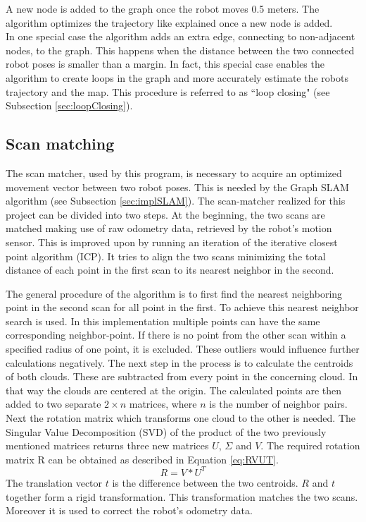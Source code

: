\documentclass{ba-kecs}
\begin{document}
A new node is added to the graph once the robot moves 0.5 meters. The algorithm optimizes the trajectory like explained once a new node is added.\\
In one special case the algorithm adds an extra edge, connecting to non-adjacent nodes, to the graph. This happens when the distance between the two connected robot poses is smaller than a margin. In fact, this special case enables the algorithm to create loops in the graph and more accurately estimate the robots trajectory and the map. This procedure is referred to as ``loop closing" (see Subsection \ref{sec:loopClosing}). 
\subsection{Scan matching}
\label{sec:scan}
The scan matcher, used by this program, is necessary to acquire an optimized movement vector between two robot poses. This is needed by the Graph SLAM algorithm (see Subsection \ref{sec:implSLAM}). The scan-matcher realized for this project can be divided into two steps. At the beginning, the two scans are matched making use of raw odometry data, retrieved by the robot's motion sensor. This is improved upon by running an iteration of the iterative closest point algorithm (ICP). It tries to align the two scans minimizing the total distance of each point in the first scan to its nearest neighbor in the second. 

The general procedure of the algorithm is to first find the nearest neighboring point in the second scan for all point in the first. To achieve this nearest neighbor search is used.
In this implementation multiple points can have the same corresponding neighbor-point. If there is no point from the other scan within a specified radius of one point, it is excluded. These outliers would influence further calculations negatively.
The next step in the process is to calculate the centroids of both clouds. These are subtracted from every point in the concerning cloud. In that way the clouds are centered at the origin. The calculated points are then added to two separate $2 \times n$ matrices, where $n$ is the number of neighbor pairs. Next the rotation matrix which transforms one cloud to the other is needed. The Singular Value Decomposition (SVD) of the product of the two previously mentioned matrices returns three new matrices $U$, $\Sigma$ and $V$. The required rotation matrix R can be obtained as described in Equation \ref{eq:RVUT}.
\begin{equation}
\label{eq:RVUT}
 R = V * U^T
\end{equation}
The translation vector $t$ is the difference between the two centroids. $R$ and $t$ together form a rigid transformation. This transformation matches the two scans. Moreover it is used to correct the robot's odometry data.
\end{document}
